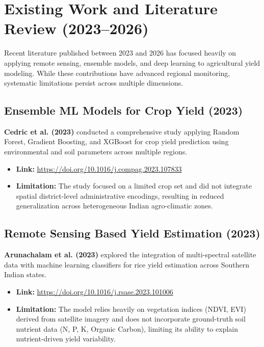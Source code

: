 \documentclass[11pt,a4paper]{article}
\begin{document}
\section{Existing Work and Literature Review (2023--2026)}
\label{sec:literature}

Recent literature published between 2023 and 2026 has focused heavily on applying remote sensing, ensemble models, and deep learning to agricultural yield modeling. While these contributions have advanced regional monitoring, systematic limitations persist across multiple dimensions.

\subsection{Ensemble ML Models for Crop Yield (2023)}
\textbf{Cedric et al. (2023)} \cite{cedric2023crop} conducted a comprehensive study applying Random Forest, Gradient Boosting, and XGBoost for crop yield prediction using environmental and soil parameters across multiple regions.
\begin{itemize}
    \item \textbf{Link:} \url{https://doi.org/10.1016/j.compag.2023.107833}
    \item \textbf{Limitation:} The study focused on a limited crop set and did not integrate spatial district-level administrative encodings, resulting in reduced generalization across heterogeneous Indian agro-climatic zones.
\end{itemize}

\subsection{Remote Sensing Based Yield Estimation (2023)}
\textbf{Arunachalam et al. (2023)} \cite{arunachalam2023remote} explored the integration of multi-spectral satellite data with machine learning classifiers for rice yield estimation across Southern Indian states.
\begin{itemize}
    \item \textbf{Link:} \url{https://doi.org/10.1016/j.rsase.2023.101006}
    \item \textbf{Limitation:} The model relies heavily on vegetation indices (NDVI, EVI) derived from satellite imagery and does not incorporate ground-truth soil nutrient data (N, P, K, Organic Carbon), limiting its ability to explain nutrient-driven yield variability.
\end{itemize}
\end{document}
